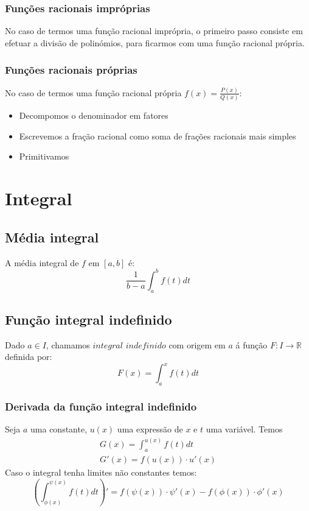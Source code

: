 \documentclass[10pt,a4paper]{report}
\begin{document}
\subsection{Funções racionais impróprias}
No caso de termos uma função racional imprópria, o primeiro passo consiste
em efetuar a divisão de polinómios, para ficarmos com uma função racional
própria.

\subsection{Funções racionais próprias}
No caso de termos uma função racional própria $f(x) = \frac{P(x)}{Q(x)}$:
\begin{itemize}
\item Decompomos o denominador em fatores
\item Escrevemos a fração racional como soma de frações racionais mais simples
\item Primitivamos
\end{itemize}

\chapter{Integral}
\section{Média integral}
A média integral de $f$ em $[a, b]$ é:
$$
\frac{1}{b-a} \int_{a}^{b}f(t) dt
$$

\section{Função integral indefinido}
Dado $a \in I$, chamamos $integral$ $indefinido$ com origem em $a$  á função $F: I \rightarrow \mathbb{R}$ definida por:
$$
F(x) = \int_{a}^{x}f(t) dt
$$
\subsection{Derivada da função integral indefinido}
Seja $a$ uma constante, $u(x)$ uma expressão de $x$ e $t$ uma variável. Temos
\begin{align}
G(x) = \int_{a}^{u(x)} f(t) dt\\
G'(x) = f(u(x)) \cdot u'(x)
\end{align}
Caso o integral tenha limites não constantes temos:
$$
\left( \int_{\phi(x)}^{\psi(x)} f(t) dt \right)' = f(\psi(x)) \cdot \psi '(x) - f(\phi(x)) \cdot \phi '(x)
$$
\end{document}
